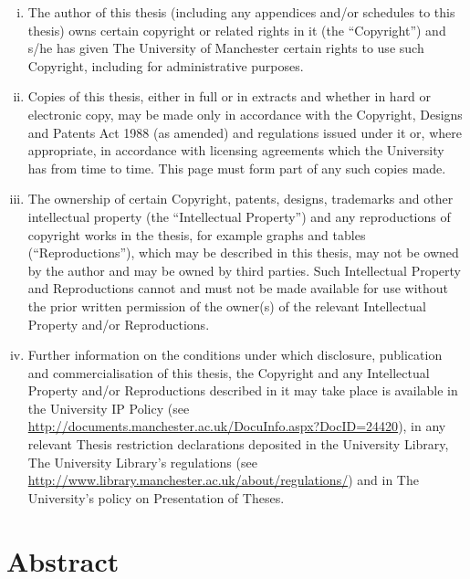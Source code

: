 \documentclass[11pt,oneside]{thesisformat}
\begin{document}
\begin{enumerate}[(i)]
\item The author of this thesis (including any appendices and/or schedules to this thesis) owns certain copyright or related rights in it (the  “Copyright”) and s/he has given The University of Manchester certain  rights to use such Copyright, including for administrative purposes.
\item Copies of this thesis, either in full or in extracts and whether in hard or electronic copy, may be made only in accordance with the Copyright, Designs and Patents Act 1988 (as  amended) and regulations issued under it or, where appropriate, in accordance with licensing agreements which the University has from time to time. This page must form part of any such copies made.
\item The ownership of certain Copyright, patents, designs, trademarks and other intellectual property (the “Intellectual Property”) and any reproductions of copyright works in the thesis, for example graphs and tables (“Reproductions”), which may be described in this thesis, may not be owned by the author and may be owned by third parties. Such Intellectual Property and Reproductions cannot and must not be made available for use without the prior written permission of the owner(s) of the relevant Intellectual Property and/or Reproductions.
\item Further information on the conditions under which disclosure, publication and commercialisation of this thesis, the Copyright and any Intellectual Property  and/or Reproductions described in it may take place is available in the University IP Policy (see \url{http://documents.manchester.ac.uk/DocuInfo.aspx?DocID=24420}), in any relevant Thesis restriction declarations deposited in the University Library, The University Library’s regulations (see \url{http://www.library.manchester.ac.uk/about/regulations/}) and in The University’s policy on Presentation of Theses.
\end{enumerate}

\chapter*{Abstract}


\end{document}
